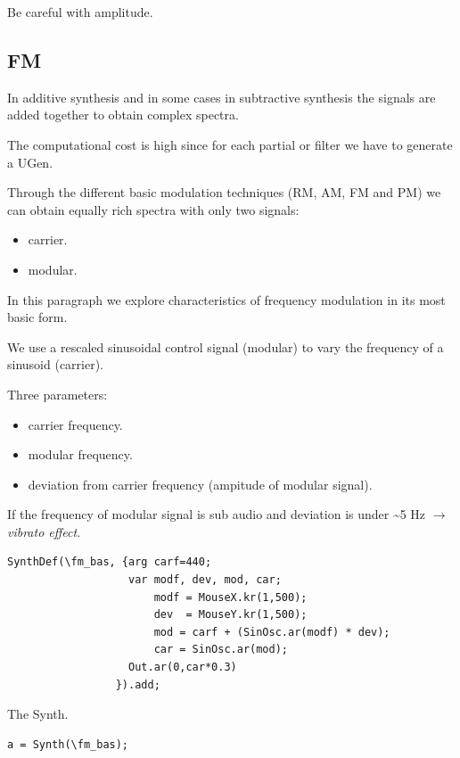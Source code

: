 Be careful with amplitude.

\subsection{FM}\label{fm}

In additive synthesis and in some cases in subtractive synthesis the signals are added together to obtain complex spectra.

The computational cost is high since for each partial or filter we have to generate a UGen.

Through the different basic modulation techniques (RM, AM, FM and PM) we can obtain equally rich spectra with only two signals: 

\begin{itemize}
\tightlist 
\item carrier. 
\item modular.
\end{itemize}

In this paragraph we explore characteristics of frequency modulation in its most basic form.

We use a rescaled sinusoidal control signal (modular) to vary the frequency of a sinusoid (carrier).

Three parameters:

\begin{itemize}
\tightlist 
\item  carrier frequency. 
\item modular frequency.
\item deviation from carrier frequency (ampitude of modular signal).
\end{itemize}

If the frequency of modular signal is sub audio and deviation is under \textasciitilde5 Hz \(\rightarrow\) \textit{vibrato effect}.

\begin{lstlisting}[frame=single, caption=Basic FM model] 
SynthDef(\fm_bas, {arg carf=440;
                   var modf, dev, mod, car;
                       modf = MouseX.kr(1,500);
                       dev  = MouseY.kr(1,500);
                       mod = carf + (SinOsc.ar(modf) * dev);
                       car = SinOsc.ar(mod);
                   Out.ar(0,car*0.3)
                 }).add;
\end{lstlisting}

The Synth.

\begin{lstlisting}[frame=single] 
a = Synth(\fm_bas);
\end{lstlisting}

